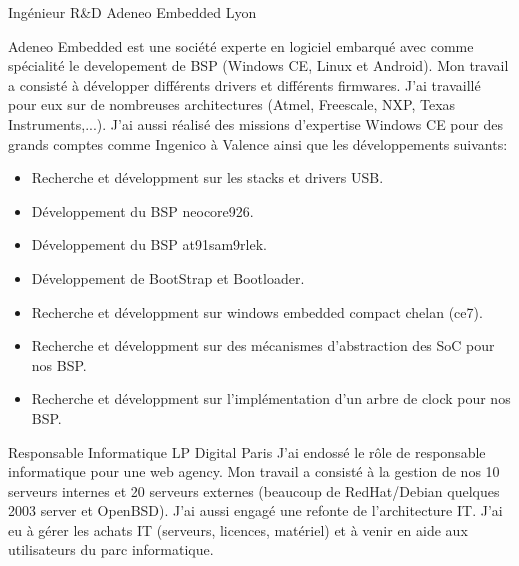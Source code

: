 \documentclass[11pt,a4paper,sans]{moderncv}
\begin{document}
{Ing\'enieur R\&D}
{Adeneo Embedded}
{Lyon}
{}
{Adeneo Embedded est une soci\'et\'e experte en logiciel embarqu\'e 
avec comme sp\'ecialit\'e le developement de BSP (Windows CE, Linux et
Android).
Mon travail a consist\'e \`a d\'evelopper diff\'erents drivers et diff\'erents
firmwares. J'ai travaill\'e pour eux sur de nombreuses architectures 
(Atmel, Freescale, NXP, Texas Instruments,...).
J'ai aussi r\'ealis\'e des missions d'expertise Windows CE pour des 
grands comptes comme Ingenico \`a Valence ainsi que les d\'eveloppements suivants:
\begin{itemize}
\item Recherche et d\'eveloppment sur les stacks et drivers USB.
\item D\'eveloppement du BSP neocore926.
\item D\'eveloppement du BSP at91sam9rlek.
\item D\'eveloppement de BootStrap et Bootloader.
\item Recherche et d\'eveloppment sur windows embedded compact chelan (ce7).
\item Recherche et d\'eveloppment sur des m\'ecanismes d'abstraction des SoC pour nos BSP.
\item Recherche et d\'eveloppment sur l'impl\'ementation d'un arbre de clock pour nos BSP.
\end{itemize}
}

{Responsable Informatique}
{LP Digital}
{Paris}
{}
{J'ai endoss\'e le r\^ole de responsable informatique pour une web agency.\newline{}
Mon travail a consist\'e \`a la gestion de nos 10 serveurs internes et 20 serveurs
externes (beaucoup de RedHat/Debian quelques 2003 server et OpenBSD). J'ai aussi
engag\'e une refonte de l'architecture IT.
J'ai eu \`a g\'erer les achats IT (serveurs, licences, mat\'eriel) et \`a venir en aide
aux utilisateurs du parc informatique.
}
\end{document}
